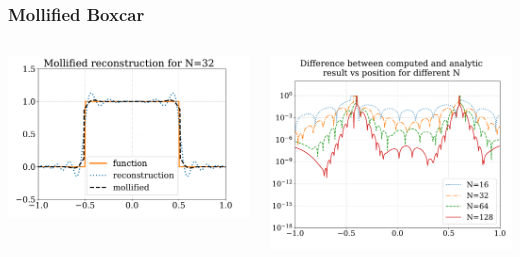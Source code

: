 \documentclass[9pt,usepdftitle=false,aspectratio=169]{beamer}
\begin{document}
\begin{frame}
  \frametitle{Mollified Boxcar}
  \begin{columns}
    \begin{column}{0.5\textwidth}
      \includegraphics[width=\textwidth]{mollifiedN32_centre}
    \end{column}
    \begin{column}{0.5\textwidth}
        \includegraphics[width=\textwidth]{mollified_pointwise_error}
    \end{column}
  \end{columns}
\end{frame}
\end{document}
